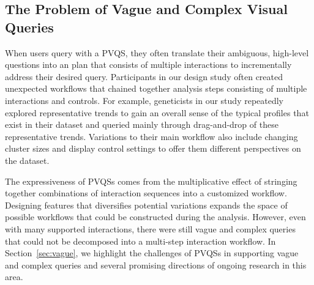 \subsection{The Problem of Vague and Complex Visual Queries}
\par When users query with a PVQS, they often translate their ambiguous, high-level questions into an plan that consists of multiple interactions to incrementally address their desired query. Participants in our \zv design study often created unexpected workflows that chained together analysis steps consisting of multiple interactions and controls. For example, geneticists in our study repeatedly explored representative trends to gain an overall sense of the typical profiles that exist in their dataset and queried mainly through drag-and-drop of these representative trends. Variations to their main workflow also include changing cluster sizes and display control settings to offer them different perspectives on the dataset. 
\par The expressiveness of PVQSs comes from the multiplicative effect of stringing together combinations of interaction sequences into a customized workflow. Designing features that diversifies potential variations expands the space of possible workflows that could be constructed during the analysis. However, even with many supported interactions, there were still vague and complex queries that could not be decomposed into a multi-step interaction workflow. In Section~\ref{sec:vague}, we highlight the challenges of PVQSs in supporting vague and complex queries and several promising directions of ongoing research in this area.
